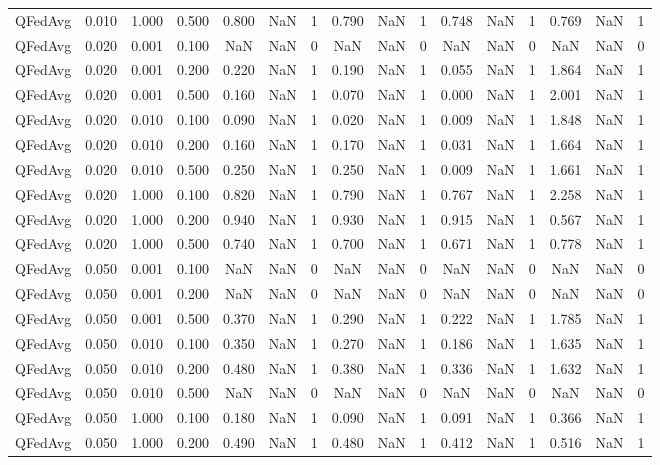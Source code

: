\begin{table}[htbp]
\begin{tabular}{lccccccccccccccc}
QFedAvg & 0.010 & 1.000 & 0.500 & 0.800 & NaN & 1 & 0.790 & NaN & 1 & 0.748 & NaN & 1 & 0.769 & NaN & 1 \\
QFedAvg & 0.020 & 0.001 & 0.100 & NaN & NaN & 0 & NaN & NaN & 0 & NaN & NaN & 0 & NaN & NaN & 0 \\
QFedAvg & 0.020 & 0.001 & 0.200 & 0.220 & NaN & 1 & 0.190 & NaN & 1 & 0.055 & NaN & 1 & 1.864 & NaN & 1 \\
QFedAvg & 0.020 & 0.001 & 0.500 & 0.160 & NaN & 1 & 0.070 & NaN & 1 & 0.000 & NaN & 1 & 2.001 & NaN & 1 \\
QFedAvg & 0.020 & 0.010 & 0.100 & 0.090 & NaN & 1 & 0.020 & NaN & 1 & 0.009 & NaN & 1 & 1.848 & NaN & 1 \\
QFedAvg & 0.020 & 0.010 & 0.200 & 0.160 & NaN & 1 & 0.170 & NaN & 1 & 0.031 & NaN & 1 & 1.664 & NaN & 1 \\
QFedAvg & 0.020 & 0.010 & 0.500 & 0.250 & NaN & 1 & 0.250 & NaN & 1 & 0.009 & NaN & 1 & 1.661 & NaN & 1 \\
QFedAvg & 0.020 & 1.000 & 0.100 & 0.820 & NaN & 1 & 0.790 & NaN & 1 & 0.767 & NaN & 1 & 2.258 & NaN & 1 \\
QFedAvg & 0.020 & 1.000 & 0.200 & 0.940 & NaN & 1 & 0.930 & NaN & 1 & 0.915 & NaN & 1 & 0.567 & NaN & 1 \\
QFedAvg & 0.020 & 1.000 & 0.500 & 0.740 & NaN & 1 & 0.700 & NaN & 1 & 0.671 & NaN & 1 & 0.778 & NaN & 1 \\
QFedAvg & 0.050 & 0.001 & 0.100 & NaN & NaN & 0 & NaN & NaN & 0 & NaN & NaN & 0 & NaN & NaN & 0 \\
QFedAvg & 0.050 & 0.001 & 0.200 & NaN & NaN & 0 & NaN & NaN & 0 & NaN & NaN & 0 & NaN & NaN & 0 \\
QFedAvg & 0.050 & 0.001 & 0.500 & 0.370 & NaN & 1 & 0.290 & NaN & 1 & 0.222 & NaN & 1 & 1.785 & NaN & 1 \\
QFedAvg & 0.050 & 0.010 & 0.100 & 0.350 & NaN & 1 & 0.270 & NaN & 1 & 0.186 & NaN & 1 & 1.635 & NaN & 1 \\
QFedAvg & 0.050 & 0.010 & 0.200 & 0.480 & NaN & 1 & 0.380 & NaN & 1 & 0.336 & NaN & 1 & 1.632 & NaN & 1 \\
QFedAvg & 0.050 & 0.010 & 0.500 & NaN & NaN & 0 & NaN & NaN & 0 & NaN & NaN & 0 & NaN & NaN & 0 \\
QFedAvg & 0.050 & 1.000 & 0.100 & 0.180 & NaN & 1 & 0.090 & NaN & 1 & 0.091 & NaN & 1 & 0.366 & NaN & 1 \\
QFedAvg & 0.050 & 1.000 & 0.200 & 0.490 & NaN & 1 & 0.480 & NaN & 1 & 0.412 & NaN & 1 & 0.516 & NaN & 1 \\

\end{tabular}
\end{table}
